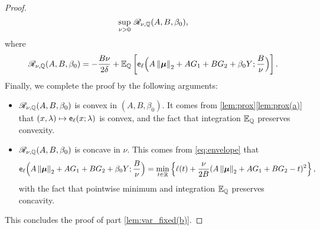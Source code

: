 \begin{proof}
\begin{equation*}
        \sup_{\nu > 0} \,
        \mathscr{R}_{\nu, \mathbb{Q}}(A, B, \beta_0), 
\end{equation*}
where
\begin{equation*} 
    \mathscr{R}_{\nu, \mathbb{Q}}(A, B, \beta_0) 
    =   - \frac{B \nu}{2 \delta }
        +
        \mathbb{E}_{\mathbb{Q}} \left[ \mathsf{e}_{\ell} \Bigl( A \left\|{{\boldsymbol{\mu}}}\right\|_2 + A G_1 + B G_2 + \beta_0 Y ; \frac{B}{\nu} \Bigr) \right].
\end{equation*}
Finally, we complete the proof by the following arguments:
\begin{itemize}
    \item $\mathscr{R}_{\nu, \mathbb{Q}}(A, B, \beta_0)$ is convex in $(A, B, \beta_0)$. It comes from \cref{lem:prox}\ref{lem:prox(a)} that $(x, \lambda) \mapsto \mathsf{e}_{\ell}(x; \lambda)$ is convex, and the fact that integration $\mathbb{E}_{\mathbb{Q}}$ preserves convexity.
    \item $\mathscr{R}_{\nu, \mathbb{Q}}(A, B, \beta_0)$ is concave in $\nu$. This comes from \cref{eq:envelope} that
    \begin{equation*}
        \mathsf{e}_{\ell} \Bigl( A \left\|{{\boldsymbol{\mu}}}\right\|_2 + A G_1 + B G_2 + \beta_0 Y ; \frac{B}{\nu} \Bigr)
        = \min_{t \in \mathbb{R}} \left\{ 
        \ell(t) + \frac{\nu}{2B} (A \left\|{{\boldsymbol{\mu}}}\right\|_2 + A G_1 + B G_2 - t)^2
        \right\},
    \end{equation*}
    with the fact that pointwise minimum and integration $\mathbb{E}_{\mathbb{Q}}$ preserves concavity. 
\end{itemize}
This concludes the proof of part \ref{lem:var_fixed(b)}.
\end{proof}



